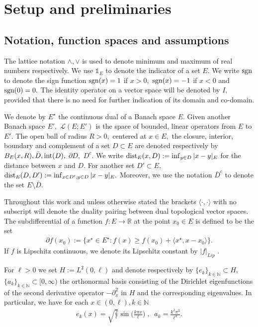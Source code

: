 \documentclass[10pt, reqno]{amsart}
\newcommand{\R}{\mathbb{R}}
\newcommand{\N}{\mathbb{N}}
\theoremstyle{definition}
\numberwithin{lem}{section}
\numberwithin{cor}{section}
\numberwithin{prop}{section}
\numberwithin{thm}{section}
\numberwithin{dfn}{section}
\begin{document}
 \section{Setup and preliminaries}\label{Sec:Setup}
 \subsection{Notation, function spaces and assumptions}\label{Sec:Notation} The lattice notation $\wedge, \vee$ is used to denote minimum and maximum of real numbers respectively. We use $\mathds{1}_E$ to denote the indicator of a set $E.$ We write $\textnormal{sgn}$ to denote the sign function $\textnormal{sgn}(x)=1$ if $x>0,$ $\textnormal{sgn}(x)=-1$ if $x<0$ and $\textnormal{sgn}(0)=0.$ The identity operator on a vector space will be denoted by $I,$ provided that there is no need for further indication of its domain and co-domain.
 
    We denote by $E^\star$ the continuous dual of a Banach space $E.$  Given another Banach space $E',$ $\mathscr{L}(E;E')$ is the space of bounded, linear operators from $E$ to $E'.$ The open ball of radius $R>0,$ centered at $x\in E,$ the closure, interior, boundary and complement of a set $D\subset E$ are denoted respectively by $B_E(x,R), \bar{D}, \textnormal{int}(D),$ $\partial D,$ $ D^c.$ We write $\textnormal{dist}_E(x, D):=\inf_{y\in D}|  x-y |_E$  for the distance between $x$ and $D.$ For another set $D'\subset E,$  $\textnormal{dist}_E(D, D'):=\inf_{x\in D', y\in D}|x-y|_E. $ Moreover, we use the notation $\bar{D}^c$ to denote the set $E\setminus\bar{D}.$

     Throughout this work and unless otherwise stated  the brackets $\langle\cdot,\cdot\rangle$ with no subscript will denote the duality pairing between dual topological vector spaces.
      The subdifferential of a function $f:E\rightarrow\R$ at the point $x_0\in E$ is defined to be the set
      \begin{equation*}\label{eq:subdifferentialdfn}
          \begin{aligned}
              \partial f(x_0):=\big\{ x^\star\in E^\star: f(x)\geq f(x_0)+\langle x^\star,x-x_0\rangle \big\}.
          \end{aligned}
      \end{equation*}
      If $f$ is Lipschitz continuous, we denote its Lipschitz constant by $|f|_{Lip}$ .
     
     
     
For $\ell>0$ we set $H:=L^2(0,\ell)$ and denote respectively by $\{e_k\}_{k\in\N}\subset H,$ $ \{a_{k}\}_{k\in\N}\subset[0,\infty)$ the orthonormal basis consisting of the Dirichlet eigenfunctions of the second derivative operator $-\partial_x^2$ in $H$ and the corresponding eigenvalues. In particular, we have for each $x\in(0,\ell), k\in\N$ 
\begin{equation*}\label{eq:Laplacianeigenpairs}
    \begin{aligned}
        e_k(x)=\sqrt{\frac{2}{\ell}}\sin\bigg(\frac{k\pi x}{\ell}   \bigg)\;,\;\; a_k=\frac{k^2\pi^2}{\ell^2}.
    \end{aligned}
\end{equation*}
\end{document}
